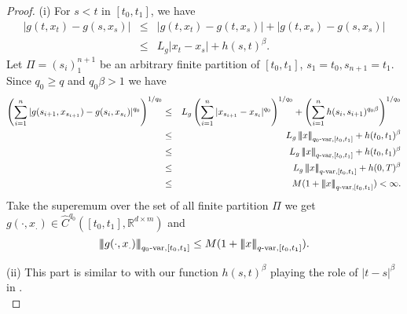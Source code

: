 \documentclass[10pt]{article}
\numberwithin{equation}{section} %
\newcommand{\R}{\ensuremath{\mathbb{R}}}
\newcommand{\ltn}{\ensuremath{\left| \! \left| \! \left|}}
\newcommand{\rtn}{\ensuremath{\right| \! \right| \! \right|}}
\begin{document}
\begin{proof} (i)
For $s<t$ in $[t_0,t_1]$, we have
	\begin{eqnarray*}
		|g(t,x_t)-g(s,x_s)|&\leq & |g(t,x_t)-g(t,x_s)|+|g(t,x_s)-g(s,x_s)|\\
		&\leq & L_g|x_t-x_s| +  h(s,t)^{\beta}.
	\end{eqnarray*}
	Let $\Pi=(s_i)_1^{n+1}$ be an arbitrary finite partition of $[t_0,t_1]$, $s_1=t_0, s_{n+1}=t_1$. Since $q_0\geq q$ and $q_0\beta>1$ we have 
	\begin{eqnarray*}
		\left(\sum_{i=1}^{n}|g(s_{i+1},x_{s_{i+1}})-g({s_i},x_{s_i})|^{q_0}\right)^{1/q_0}&\leq & L_g \left(\sum_{i=1}^{n} |x_{s_{i+1}}-x_{s_i}|^{q_0}\right)^{1/q_0} +  \left(\sum_{i=1}^{n} h(s_{i},s_{i+1})^{q_0\beta}	\right)^{1/q_0}\\
		&\leq & L_g\ltn x\rtn_{q_0\text{-var},[t_0,t_1]}+ h(t_0,t_1)^{\beta}\\
		&\leq & L_g\ltn x\rtn_{q\text{-var},[t_0,t_1]}+ h(t_0,t_1)^{\beta} \\
		&\leq & L_g\ltn x\rtn_{q\text{-var},[t_0,t_1]}+ h(0,T)^{\beta} \\
		&\leq & M(1+\ltn x\rtn_{q\text{-var},[t_0,t_1]})<\infty.
	\end{eqnarray*}
	Take the superemum over the set of all finite partition $\Pi$ we get $g(\cdot,x_.) \in \widehat{C}^{q_0}([t_0,t_1],\R^{d\times m})$ and
	$$
	\ltn g(\cdot,x_.)\rtn_{q_0\text{-var},[t_0,t_1]}\leq M(1+\ltn x\rtn_{q\text{-var},[t_0,t_1]}).
	$$


	(ii) This part is similar to \cite[Lemma 7.1]{nualart3} with our function $h(s,t)^\beta$ playing the role of  $|t-s|^\beta$ in \cite[Lemma 7.1]{nualart3}.\\
	

\end{proof}
\end{document}
